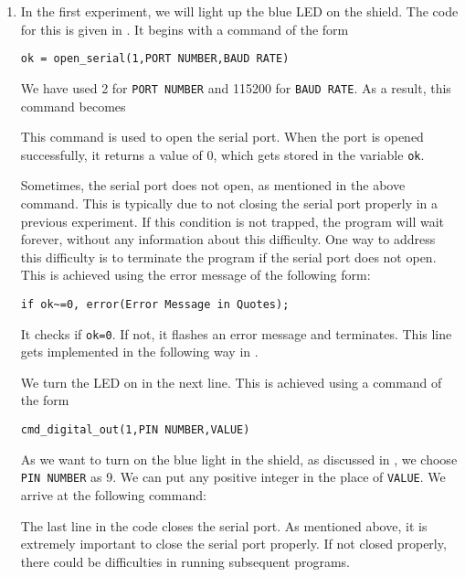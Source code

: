 \begin{enumerate}
\item In the first experiment, we will light up the blue LED on the
  shield.  The code for this is given in .  It
  begins with a command of the form
  \begin{lstlisting}[style=nonumbers]
     ok = open_serial(1,PORT NUMBER,BAUD RATE)
  \end{lstlisting}
  We have used 2 for {\tt PORT NUMBER} and 115200 for {\tt BAUD RATE}.
  As a result, this command becomes
  
  This command is used to open the serial port.  When the port is
  opened successfully, it returns a value of 0, which gets stored in
  the variable {\tt ok}.

  Sometimes, the serial port does not open, as mentioned in the above
  command.  This is typically due to not closing the serial port
  properly in a previous experiment.  If this condition is not
  trapped, the program will wait forever, without any information
  about this difficulty.  One way to address this difficulty is to
  terminate the program if the serial port does not open.  This is
  achieved using the error message of the following form:
  \begin{lstlisting}[style=nonumbers]
     if ok~=0, error(Error Message in Quotes);
  \end{lstlisting}
  It checks if {\tt ok=0}.  If not, it flashes an error message and
  terminates.  This line gets implemented in the following way in
  .  
  

  We turn the LED on in the next line.  This is achieved using a
  command of the form
  \begin{lstlisting}[style=nonumbers]
    cmd_digital_out(1,PIN NUMBER,VALUE)
  \end{lstlisting}
  As we want to turn on the blue light in the shield, as discussed in
  , we choose {\tt PIN NUMBER} as 9.  We can put
  any positive integer in the place of {\tt VALUE}.  We arrive at the
  following command:
  

  The last line in the code closes the serial port.  As mentioned
  above, it is extremely important to close the serial port properly.
  If not closed properly, there could be difficulties in running
  subsequent programs.


\end{enumerate}
